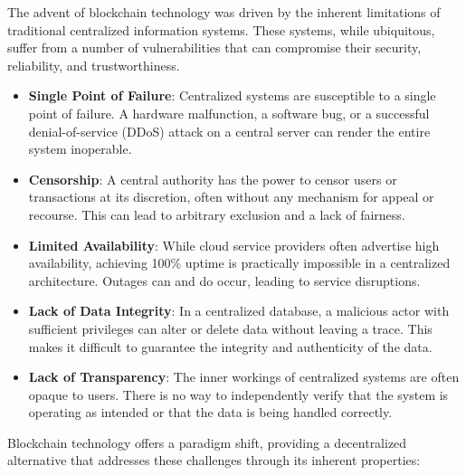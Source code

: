 The advent of blockchain technology was driven by the inherent
limitations of traditional centralized information systems. These
systems, while ubiquitous, suffer from a number of vulnerabilities that
can compromise their security, reliability, and trustworthiness.

\begin{itemize}
	\tightlist
	\item
	\textbf{Single Point of Failure}: Centralized systems are susceptible
	to a single point of failure. A hardware malfunction, a software bug,
	or a successful denial-of-service (DDoS) attack on a central server
	can render the entire system inoperable.
	\item
	\textbf{Censorship}: A central authority has the power to censor users
	or transactions at its discretion, often without any mechanism for
	appeal or recourse. This can lead to arbitrary exclusion and a lack of
	fairness.
	\item
	\textbf{Limited Availability}: While cloud service providers often
	advertise high availability, achieving 100\% uptime is practically
	impossible in a centralized architecture. Outages can and do occur,
	leading to service disruptions.
	\item
	\textbf{Lack of Data Integrity}: In a centralized database, a
	malicious actor with sufficient privileges can alter or delete data
	without leaving a trace. This makes it difficult to guarantee the
	integrity and authenticity of the data.
	\item
	\textbf{Lack of Transparency}: The inner workings of centralized
	systems are often opaque to users. There is no way to independently
	verify that the system is operating as intended or that the data is
	being handled correctly.
\end{itemize}

Blockchain technology offers a paradigm shift, providing a decentralized
alternative that addresses these challenges through its inherent
properties:

